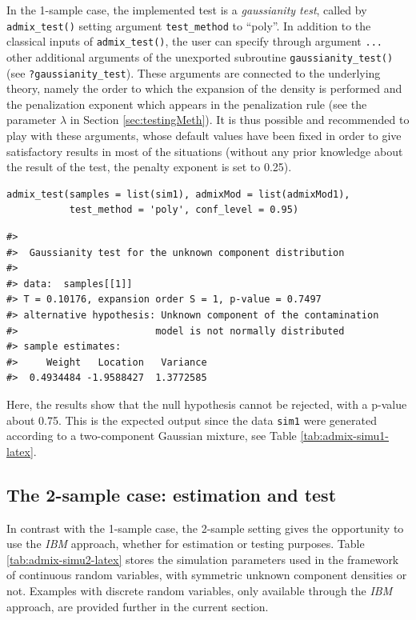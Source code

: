 In the 1-sample case, the implemented test is a \emph{gaussianity test}, called by \texttt{admix\_test()} setting argument \texttt{test\_method} to ``poly''. In addition to the classical inputs of \texttt{admix\_test()}, the user can specify through argument \texttt{...} other additional arguments of the unexported subroutine \texttt{gaussianity\_test()} (see \texttt{?gaussianity\_test}). These arguments are connected to the underlying theory, namely the order to which the expansion of the density is performed and the penalization exponent which appears in the penalization rule (see the parameter \(\lambda\) in Section \ref{sec:testingMeth}). It is thus possible and recommended to play with these arguments, whose default values have been fixed in order to give satisfactory results in most of the situations (without any prior knowledge about the result of the test, the penalty exponent is set to 0.25).

\begin{verbatim}
admix_test(samples = list(sim1), admixMod = list(admixMod1),
           test_method = 'poly', conf_level = 0.95)
\end{verbatim}

\begin{verbatim}
#> 
#>  Gaussianity test for the unknown component distribution
#> 
#> data:  samples[[1]]
#> T = 0.10176, expansion order S = 1, p-value = 0.7497
#> alternative hypothesis: Unknown component of the contamination 
#>                        model is not normally distributed
#> sample estimates:
#>     Weight   Location   Variance 
#>  0.4934484 -1.9588427  1.3772585
\end{verbatim}

Here, the results show that the null hypothesis cannot be rejected, with a p-value about 0.75. This is the expected output since the data \texttt{sim1} were generated according to a two-component Gaussian mixture, see Table \ref{tab:admix-simu1-latex}.

\subsection{The 2-sample case: estimation and test}\label{the-2-sample-case-estimation-and-test}

In contrast with the 1-sample case, the 2-sample setting gives the opportunity to use the \emph{IBM} approach, whether for estimation or testing purposes. Table \ref{tab:admix-simu2-latex} stores the simulation parameters used in the framework of continuous random variables, with symmetric unknown component densities or not. Examples with discrete random variables, only available through the \emph{IBM} approach, are provided further in the current section.

